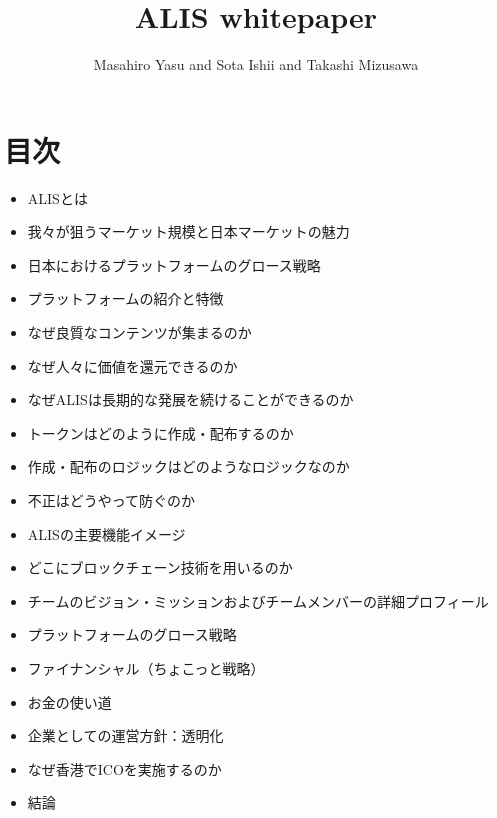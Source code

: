 \documentclass{jsarticle}
\begin{document}
\title{ALIS whitepaper}
\author{Masahiro Yasu and Sota Ishii and Takashi Mizusawa}
\maketitle

\section{目次}
\begin{itemize}
	\item ALISとは
	\item 我々が狙うマーケット規模と日本マーケットの魅力
	\item 日本におけるプラットフォームのグロース戦略
	\item プラットフォームの紹介と特徴
	\item なぜ良質なコンテンツが集まるのか
	\item なぜ人々に価値を還元できるのか
	\item なぜALISは長期的な発展を続けることができるのか
	\item トークンはどのように作成・配布するのか
	\item 作成・配布のロジックはどのようなロジックなのか
	\item 不正はどうやって防ぐのか
	\item ALISの主要機能イメージ
	\item どこにブロックチェーン技術を用いるのか
	\item チームのビジョン・ミッションおよびチームメンバーの詳細プロフィール
	\item プラットフォームのグロース戦略
	\item ファイナンシャル（ちょこっと戦略）
	\item お金の使い道
	\item 企業としての運営方針：透明化
	\item なぜ香港でICOを実施するのか
	\item 結論
\end{itemize}
\end{document}
